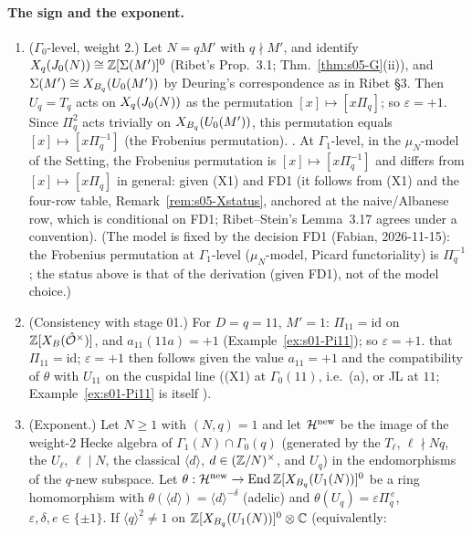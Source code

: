 \paragraph{The sign and the exponent.}
\begin{proposition}[$\varepsilon=+1$; exponent $+1$]\label{prop:s05-sign}
\begin{enumerate}[label=(\alph*)]
\item ($\Gamma_0$-level, weight $2$.) Let $N=qM'$ with $q\nmid M'$, and identify $X_q(J_0(N))\cong\mathbb{Z}[\Sigma(M')]^0$ (Ribet's
  Prop.~3.1; Thm.~\ref{thm:s05-G}(ii)), and $\Sigma(M')\cong X_{B_q}(U_0(M'))$ by Deuring's correspondence as in Ribet \S3. Then $U_q=T_q$ acts
  on $X_q(J_0(N))$ as the permutation $[x]\mapsto[x\Pi_q]$; so $\varepsilon=+1$. Since $\Pi_q^2$ acts trivially on
  $X_{B_q}(U_0(M'))$, this permutation equals $[x]\mapsto[x\Pi_q^{-1}]$ (the Frobenius permutation). \stpmc.
  At $\Gamma_1$-level, in the $\mu_N$-model of the Setting, the Frobenius permutation is $[x]\mapsto[x\Pi_q^{-1}]$ and differs from
  $[x]\mapsto[x\Pi_q]$ in general: \stpmc{} given (X1) and FD1 (it follows from (X1) and the four-row table, Remark~\ref{rem:s05-Xstatus}, anchored at the naive/Albanese row, which is \stpmc{} conditional on FD1; Ribet--Stein's Lemma~3.17 agrees under a convention).
  (The model is fixed by the decision FD1 (Fabian, 2026-11-15): the Frobenius permutation at $\Gamma_1$-level ($\mu_N$-model, Picard functoriality) is $\Pi_q^{-1}$; the status \stpmc{} above is that of the derivation (given FD1), not of the model choice.)
\item (Consistency with stage 01.) For $D=q=11$, $M'=1$: $\Pi_{11}=\mathrm{id}$ on $\mathbb{Z}[X_B(\hat{\mathcal{O}}^\times)]$, and $a_{11}(11a)=+1$
  (Example~\ref{ex:s01-Pi11}); so $\varepsilon=+1$. \stproved{} that $\Pi_{11}=\mathrm{id}$; $\varepsilon=+1$ then follows given the \stknown{} value $a_{11}=+1$ and the compatibility of
  $\theta$ with $U_{11}$ on the cuspidal line ((X1) at $\Gamma_0(11)$, i.e.\ (a), or JL at $11$; Example~\ref{ex:s01-Pi11} is itself \stpmc).
\item (Exponent.) Let $N\ge1$ with $(N,q)=1$ and let $\mathcal{H}^{\rm new}$ be the image of the weight-$2$ Hecke algebra of
  $\Gamma_1(N)\cap\Gamma_0(q)$ (generated by the $T_\ell$, $\ell\nmid Nq$, the $U_\ell$, $\ell\mid N$, the classical
  $\langle d\rangle$, $d\in(\mathbb{Z}/N)^\times$, and $U_q$) in the endomorphisms of the $q$-new subspace. Let
  $\theta:\mathcal{H}^{\rm new}\to\operatorname{End}\mathbb{Z}[X_{B_q}(U_1(N))]^0$ be a ring homomorphism with $\theta(\langle d\rangle)=\langle d\rangle^{-\delta}$ (adelic)
  and $\theta(U_q)=\varepsilon\Pi_q^{\,e}$, $\varepsilon,\delta,e\in\{\pm1\}$. If $\langle q\rangle^2\ne1$ on $\mathbb{Z}[X_{B_q}(U_1(N))]^0\otimes\mathbb{C}$ (equivalently:

\end{enumerate}
\end{proposition}
